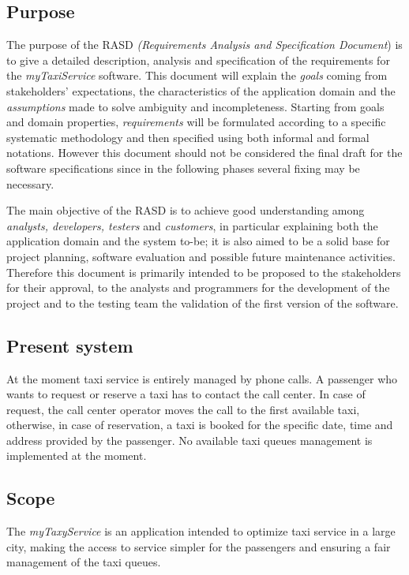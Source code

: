 
\subsection{Purpose}

The purpose of the RASD \emph{(Requirements Analysis and Specification
Document}) is to give a detailed description, analysis and specification
of the requirements for the \emph{myTaxiService} software. This document
will explain the \emph{goals} coming from stakeholders' expectations,
the characteristics of the application domain and the \emph{assumptions}
made to solve ambiguity and incompleteness. Starting from goals and
domain properties, \emph{requirements} will be formulated according
to a specific systematic methodology and then specified using both
informal and formal notations. However this document should not be
considered the final draft for the software specifications since in
the following phases several fixing may be necessary. 

The main objective of the RASD is to achieve good understanding among
\emph{analysts, developers, testers} and \emph{customers}, in particular
explaining both the application domain and the system to-be; it is
also aimed to be a solid base for project planning, software evaluation
and possible future maintenance activities. Therefore this document
is primarily intended to be proposed to the stakeholders for their
approval, to the analysts and programmers for the development of the
project and to the testing team the validation of the first version
of the software.


\subsection{Present system}

At the moment taxi service is entirely managed by phone calls. A passenger
who wants to request or reserve a taxi has to contact the call center.
In case of request, the call center operator moves the call to the
first available taxi, otherwise, in case of reservation, a taxi is
booked for the specific date, time and address provided by the passenger.
No available taxi queues management is implemented at the moment. 


\subsection{Scope}

The \emph{myTaxyService} is an application intended to optimize taxi
service in a large city, making the access to service simpler for
the passengers and ensuring a fair management of the taxi queues. 

